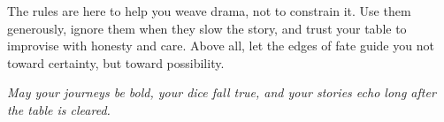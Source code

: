 \documentclass[11pt,letterpaper,twoside]{book}
\begin{document}
The rules are here to help you weave drama, not to constrain it. Use them generously, ignore them when they slow the story, and trust your table to improvise with honesty and care. Above all, let the edges of fate guide you not toward certainty, but toward possibility.

\vfill
\begin{center}
\itshape
May your journeys be bold, your dice fall true, and your stories echo long after the table is cleared.
\end{center}

\backmatter
\printindex
\end{document}
